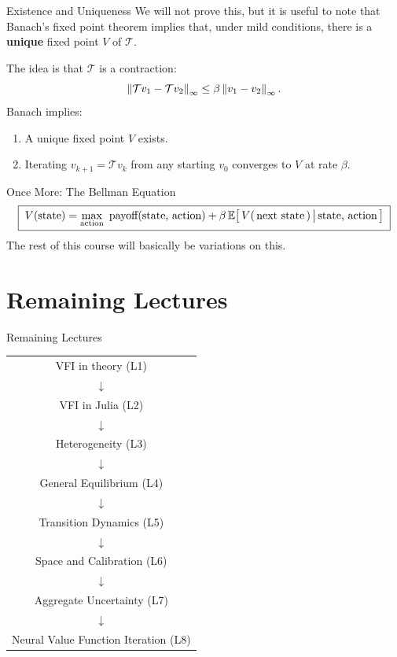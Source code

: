 \documentclass[10pt,aspectratio=169]{beamer}
\begin{document}
\begin{frame}{Existence and Uniqueness}
  We will not prove this, but it is useful to note that Banach's fixed point theorem implies that, under mild conditions, there is a \textbf{unique} fixed point $V$ of $\mathcal{T}$.

  The idea is that $\mathcal{T}$ is a contraction:
  \[
    \left\| \mathcal{T} v_1 - \mathcal{T} v_2 \right\|_\infty
      \le \beta \left\| v_1 - v_2 \right\|_\infty.
  \]
  Banach implies:
  \begin{enumerate}
    \item A unique fixed point $V$ exists.
    \item Iterating $v_{k+1} = \mathcal{T} v_k$ from any starting $v_0$ converges to $V$ at rate $\beta$.
  \end{enumerate}
\end{frame}

\begin{frame}{Once More: The Bellman Equation}
\[
  \boxed{\;
    V(\text{state}) = \max_{\text{action}}\ \text{payoff}(\text{state, action}) + \beta \, \mathbb{E}\!\left[\, V(\,\text{next state}\,) \,\big|\, \text{state, action} \,\right]
  \;}
\]
The rest of this course will basically be variations on this.
\end{frame}

\section{Remaining Lectures}

\begin{frame}{Remaining Lectures}
\centering
\footnotesize
\setlength{\tabcolsep}{4pt}
\renewcommand{\arraystretch}{0.9}
\begin{tabular}{c}
VFI in theory \quad (L1) \\
$\downarrow$ \\
VFI in Julia \quad (L2) \\
$\downarrow$ \\
Heterogeneity \quad (L3) \\
$\downarrow$ \\
General Equilibrium \quad (L4) \\
$\downarrow$ \\
Transition Dynamics \quad (L5) \\
$\downarrow$ \\
Space and Calibration \quad (L6) \\
$\downarrow$ \\
Aggregate Uncertainty \quad (L7) \\
$\downarrow$ \\
\alert{Neural Value Function Iteration} \quad (L8)
\end{tabular}
\end{frame}
\end{document}

